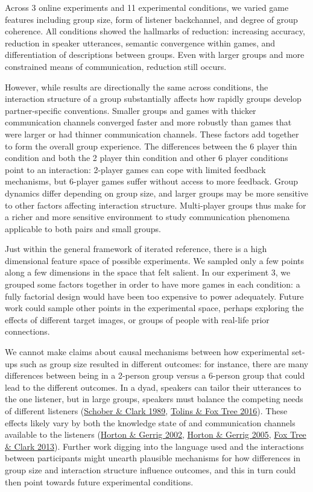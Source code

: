 \documentclass[
  english,
  a4paper,
]{article}
\begin{document}
Across 3 online experiments and 11 experimental conditions, we varied game features including group size, form of listener backchannel, and degree of group coherence. All conditions showed the hallmarks of reduction: increasing accuracy, reduction in speaker utterances, semantic convergence within games, and differentiation of descriptions between groups. Even with larger groups and more constrained means of communication, reduction still occurs.

However, while results are directionally the same across conditions, the interaction structure of a group substantially affects how rapidly groups develop partner-specific conventions. Smaller groups and games with thicker communication channels converged faster and more robustly than games that were larger or had thinner communication channels. These factors add together to form the overall group experience. The differences between the 6 player thin condition and both the 2 player thin condition and other 6 player conditions point to an interaction: 2-player games can cope with limited feedback mechanisms, but 6-player games suffer without access to more feedback. Group dynamics differ depending on group size, and larger groups may be more sensitive to other factors affecting interaction structure. Multi-player groups thus make for a richer and more sensitive environment to study communication phenomena applicable to both pairs and small groups.

Just within the general framework of iterated reference, there is a high dimensional feature space of possible experiments. We sampled only a few points along a few dimensions in the space that felt salient. In our experiment 3, we grouped some factors together in order to have more games in each condition: a fully factorial design would have been too expensive to power adequately. Future work could sample other points in the experimental space, perhaps exploring the effects of different target images, or groups of people with real-life prior connections.

We cannot make claims about causal mechanisms between how experimental set-ups such as group size resulted in different outcomes: for instance, there are many differences between being in a 2-person group versus a 6-person group that could lead to the different outcomes. In a dyad, speakers can tailor their utterances to the one listener, but in large groups, speakers must balance the competing needs of different listeners (\protect\hyperlink{ref-schober1989}{Schober \& Clark 1989}, \protect\hyperlink{ref-tolins2016}{Tolins \& Fox Tree 2016}). These effects likely vary by both the knowledge state of and communication channels available to the listeners (\protect\hyperlink{ref-horton2002}{Horton \& Gerrig 2002}, \protect\hyperlink{ref-horton2005}{Horton \& Gerrig 2005}, \protect\hyperlink{ref-fox-tree2013}{Fox Tree \& Clark 2013}). Further work digging into the language used and the interactions between participants might unearth plausible mechanisms for how differences in group size and interaction structure influence outcomes, and this in turn could then point towards future experimental conditions.
\end{document}
